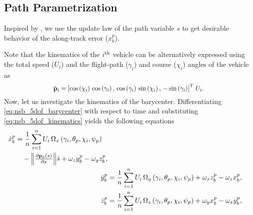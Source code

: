\subsection{Path Parametrization}
\label{sec:nsb_5dof_path_parameter}
Inspired by \cite{belleter_2019_observer}, we use the update law of the path variable $s$ to get desirable behavior of the along-track error ($x_b^p$).

Note that the kinematics of the $i^{\rm th}$ vehicle can be alternatively expressed using the total speed ($U_i$) and the flight-path ($\gamma_i$) and course ($\chi_i$) angles of the vehicle as
\begin{equation}
    \scale[0.91]{\dot{\mat{p}}_i = \left[\cos\left(\chi_i\right)\,\cos\left(\gamma_i\right) ,\, \cos\left(\gamma_i\right)\,\sin\left(\chi_i\right) ,\, -\sin\left(\gamma_i\right)\right]\T \, U_i.} \label{eq:nsb_5dof_kinematics}
\end{equation}
Now, let us investigate the kinematics of the barycenter.
Differentiating \eqref{eq:nsb_5dof_barycenter} with respect to time and substituting \eqref{eq:nsb_5dof_kinematics} yields the following equations
\begin{subequations}
    \begin{align}
        \begin{split}
            \dot{x}_b^p &= \frac{1}{n}\sum_{i=1}^n U_i\,\Omega_x\left(\gamma_i, \theta_p, \chi_i, \psi_p\right) \\
            &\quad - \scale{\norm{\frac{\partial \mat{p}_p(s)}{\partial s}}}\dot{s} + \omega_zy_b^p - \omega_yz_b^p,
        \end{split} \label{eq:nsb_5dof_x_pb} \\
        \dot{y}_b^p &= \frac{1}{n}\sum_{i=1}^n U_i\,\Omega_y\left(\gamma_i, \theta_p, \chi_i, \psi_p\right) + \omega_xz_b^p - \omega_zx_b^p, \label{eq:nsb_5dof_y_pb} \\
        \dot{z}_b^p &= \frac{1}{n}\sum_{i=1}^n U_i\,\Omega_z\left(\gamma_i, \theta_p, \chi_i, \psi_p\right) + \omega_yx_b^p - \omega_xy_b^p, \label{eq:nsb_5dof_z_pb}
    \end{align} \label{eq:nsb_5dof_barycenter_kinematics}
\end{subequations}

